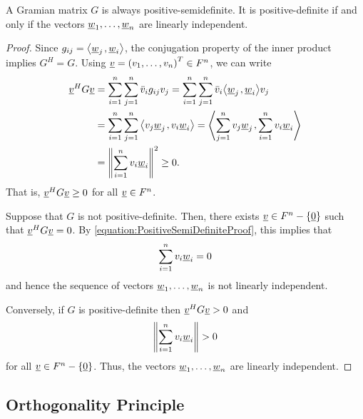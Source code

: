 \begin{theorem}
A Gramian matrix $G$ is always positive-semidefinite.
It is positive-definite if and only if the vectors $\underline{w}_1, \ldots, \underline{w}_n$ are linearly independent.
\end{theorem}
\begin{proof}
Since $g_{ij} = {\left\langle  \underline{w}_j  \mskip2mu ,  \underline{w}_i  \right\rangle}$, the conjugation property of the inner product implies $G^H = G$.
Using $\underline{v} = \left( v_1, \ldots, v_n \right)^T \in F^n$, we can write
\begin{equation} \label{equation:PositiveSemiDefiniteProof}
\begin{split}
\underline{v}^H G \underline{v} &=
\sum_{i=1}^n \sum_{j=1}^n \bar{v}_i g_{ij} v_j
= \sum_{i=1}^n \sum_{j=1}^n \bar{v}_i {\left\langle  \underline{w}_j  \mskip2mu ,  \underline{w}_i  \right\rangle} v_j \\
&= \sum_{i=1}^n \sum_{j=1}^n {\left\langle  v_j \underline{w}_j  \mskip2mu ,  v_i \underline{w}_i  \right\rangle}
= {\left\langle  \sum_{j=1}^n v_j \underline{w}_j  \mskip2mu ,  \sum_{i=1}^n v_i \underline{w}_i  \right\rangle} \\
&= \left\| \sum_{i=1}^n v_i \underline{w}_i \right\|^2
\geq 0.
\end{split}
\end{equation}
That is, $\underline{v}^H G \underline{v} \geq 0$ for all $\underline{v} \in F^n$.

Suppose that $G$ is not positive-definite.
Then, there exists $\underline{v} \in F^n - \left\{ \underline{0} \right\}$ such that $\underline{v}^H G \underline{v} = 0$.
By \eqref{equation:PositiveSemiDefiniteProof}, this implies that
\begin{equation*}
\sum_{i=1}^n v_i \underline{w}_i = 0
\end{equation*}
and hence the sequence of vectors $\underline{w}_1, \ldots, \underline{w}_n$ is not linearly independent.

Conversely, if $G$ is positive-definite then $\underline{v}^H G \underline{v} > 0$ and
\begin{equation*}
\left\| \sum_{i=1}^n v_i \underline{w}_i \right\| > 0
\end{equation*}
for all $\underline{v} \in F^n - \left\{ \underline{0} \right\}$.
Thus, the vectors $\underline{w}_1, \ldots, \underline{w}_n$ are linearly independent.
\end{proof}


\subsection{Orthogonality Principle}

